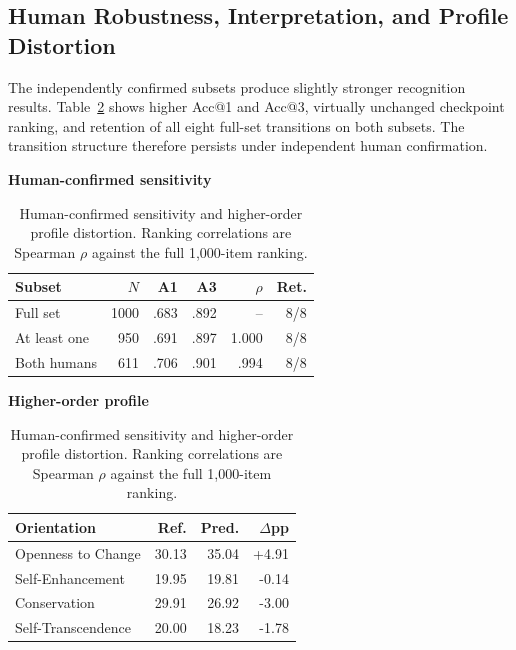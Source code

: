 \documentclass[runningheads,a4paper]{llncs}
\begin{document}
\subsection{Human Robustness, Interpretation, and Profile Distortion}

The independently confirmed subsets produce slightly stronger recognition results. Table~\ref{tab:robustprofile} shows higher Acc@1 and Acc@3, virtually unchanged checkpoint ranking, and retention of all eight full-set transitions on both subsets. The transition structure therefore persists under independent human confirmation.

\begin{table}[H]
\caption{Human-confirmed sensitivity and higher-order profile distortion. Ranking correlations are Spearman $\rho$ against the full 1,000-item ranking.}
\label{tab:robustprofile}
\centering
\begin{minipage}[t]{0.49\textwidth}
\centering
\scriptsize
\textbf{Human-confirmed sensitivity}\\[2pt]
\setlength{\tabcolsep}{2.3pt}
\renewcommand{\arraystretch}{0.96}
\begin{tabular}{@{}lrrrrr@{}}
\toprule
Subset & $N$ & A1 & A3 & $\rho$ & Ret. \\
\midrule
Full set & 1000 & .683 & .892 & -- & 8/8 \\
At least one & 950 & .691 & .897 & 1.000 & 8/8 \\
Both humans & 611 & .706 & .901 & .994 & 8/8 \\
\bottomrule
\end{tabular}
\end{minipage}\hfill
\begin{minipage}[t]{0.49\textwidth}
\centering
\scriptsize
\textbf{Higher-order profile}\\[2pt]
\setlength{\tabcolsep}{2.3pt}
\renewcommand{\arraystretch}{0.96}
\begin{tabular}{@{}lrrr@{}}
\toprule
Orientation & Ref. & Pred. & $\Delta$pp \\
\midrule
Openness to Change & 30.13 & 35.04 & +4.91 \\
Self-Enhancement & 19.95 & 19.81 & -0.14 \\
Conservation & 29.91 & 26.92 & -3.00 \\
Self-Transcendence & 20.00 & 18.23 & -1.78 \\
\bottomrule
\end{tabular}
\end{minipage}
\end{table}
\end{document}
